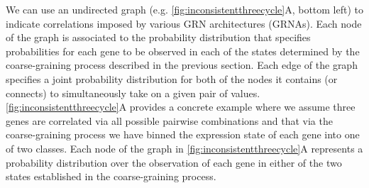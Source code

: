 We can use an undirected graph (e.g. \ref{fig:inconsistentthreecycle}A, bottom left) to indicate correlations imposed by various GRN architectures (GRNAs). Each node of the graph is associated to the probability distribution that specifies probabilities for each gene to be observed in each of the states determined by the coarse-graining process described in the previous section. Each edge of the graph specifies a joint probability distribution for both of the nodes it contains (or connects) to simultaneously take on a given pair of values.
\ref{fig:inconsistentthreecycle}A provides a concrete example where we assume three genes are correlated via all possible pairwise combinations and that via the coarse-graining process we have binned the expression state of each gene into one of two classes.
Each node of the graph in \ref{fig:inconsistentthreecycle}A represents a probability distribution over the observation of each gene in either of the two states established in the coarse-graining process.
